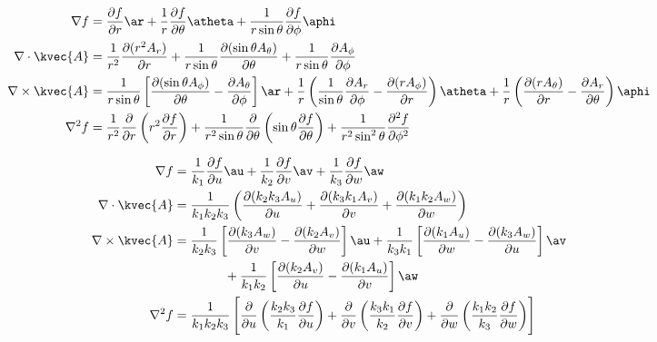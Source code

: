 \begin{align*}
\nabla f &=\frac{\partial f}{\partial r}\ar+\frac{1}{r}\frac{\partial f}{\partial \theta}\atheta+\frac{1}{r \sin \theta}\frac{\partial f}{\partial \phi}\aphi\\
\nabla \cdot \kvec{A}&=\frac{1}{r^2}\frac{\partial (r^2 A_r)}{\partial r}+\frac{1}{r \sin \theta }\frac{\partial ( \sin \theta A_{\theta})}{\partial \theta}+\frac{1}{r \sin \theta}\frac{\partial A_{\phi}}{\partial \phi}\\
\nabla \times \kvec{A}&=\frac{1}{r \sin \theta}\left[\frac{\partial (\sin \theta A_{\phi})}{\partial \theta}-\frac{\partial A_{\theta}}{\partial \phi} \right]\ar+\frac{1}{r}\left(\frac{1}{\sin \theta}\frac{\partial A_r}{\partial \phi}-\frac{\partial (r A_{\phi})}{\partial r} \right)\atheta+\frac{1}{r}\left(\frac{\partial (r A_{\theta})}{\partial r}-\frac{\partial A_r}{\partial \theta} \right)\aphi \\
\nabla^2 f &=\frac{1}{r^2}\frac{\partial}{\partial r}\left(r^2 \frac{\partial f}{\partial r} \right)+\frac{1}{r^2 \sin \theta}\frac{\partial}{\partial \theta}\left(\sin \theta \frac{\partial f}{\partial \theta} \right)+\frac{1}{r^2 \sin^2 \theta}\frac{\partial^2  f}{\partial {\phi}^2}
\end{align*}


\begin{align*}
\nabla f &=\frac{1}{k_1}\frac{\partial f}{\partial u}\au+\frac{1}{k_2}\frac{\partial f}{\partial v}\av+\frac{1}{k_3}\frac{\partial f}{\partial w}\aw\\
\nabla \cdot \kvec{A}&=\frac{1}{k_1 k_2 k_3}\left(\frac{\partial (k_2 k_3 A_u)}{\partial u}+\frac{\partial ( k_3 k_1 A_v)}{\partial v}+\frac{\partial (k_1 k_2 A_w)}{\partial w}\right)\\
\nabla \times \kvec{A}&=\frac{1}{k_2 k_3}\left[\frac{\partial (k_3 A_w)}{\partial v}-\frac{\partial (k_2 A_v)}{\partial w} \right]\au+\frac{1}{k_3 k_1}\left[\frac{\partial (k_1 A_u)}{\partial w}-\frac{\partial (k_3 A_w)}{\partial u} \right]\av\\
& \quad \quad \quad \quad +\frac{1}{k_1 k_2}\left[\frac{\partial (k_2 A_v)}{\partial u}-\frac{\partial (k_1 A_u)}{\partial v} \right]\aw \\
\nabla^2 f &=\frac{1}{k_1 k_2 k_3} \left[\frac{\partial}{\partial u}\left(\frac{k_2 k_3}{k_1}\frac{\partial f}{\partial u} \right)+\frac{\partial}{\partial v}\left(\frac{k_3 k_1}{k_2}\frac{\partial f}{\partial v} \right)+\frac{\partial}{\partial w}\left(\frac{k_1 k_2}{k_3}\frac{\partial f}{\partial w} \right)\right]
\end{align*}

